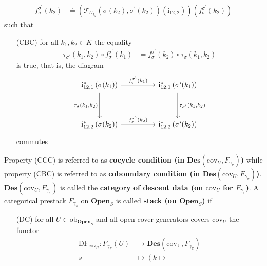 \begin{exa}
\begin{enumerate}
\begin{align*}
  f_{\sigma}^{\sigma^{\backprime}}(k_{2})
  &\doteq
  \left(
    \mathcal{T}_{U_{k_{2}}}
    \left(
      \sigma(k_{2}),
      \sigma^{\backprime}(k_{2})
    \right)
    \left(
      \mathrm{i}_{12,2}
    \right)
  \right)
  \left(
    f_{\sigma}^{\sigma^{\backprime}}(k_{2})
  \right)
\end{align*}
such that
\begin{enumerate}
\item[(CBC)]
for all $k_{1},k_{2} \in K$ the equality
\begin{align*}
  \tau_{\sigma^{\backprime}}(k_{1},k_{2})
  \circ
  f_{\sigma}^{\sigma^{\backprime}}(k_{1})
  &=
  f_{\sigma}^{\sigma^{\backprime}}(k_{2})
  \circ
  \tau_{\sigma}(k_{1},k_{2})
\end{align*}
is true, that is, the diagram
\[
\begin{tikzcd}[sep=huge]
  \mathrm{i}_{12,1}^{\ast}
  \left(
    \sigma(k_{1})
  \right)
  \arrow{r}{f_{\sigma}^{\sigma^{\backprime}}(k_{1})}
  \arrow[swap]{d}{\tau_{\sigma}(k_{1},k_{2})}
  &
  \mathrm{i}_{12,1}^{\ast}
  \left(
    \sigma^{\backprime}(k_{1})
  \right)
  \arrow{d}{\tau_{\sigma^{\backprime}}(k_{1},k_{2})}
  \\
  \mathrm{i}_{12,2}^{\ast}
  \left(
    \sigma(k_{2})
  \right)
  \arrow{r}{f_{\sigma}^{\sigma^{\backprime}}(k_{2})}
  &
  \mathrm{i}_{12,2}^{\ast}
  \left(
    \sigma^{\backprime}(k_{2})
  \right)
\end{tikzcd}
\]
commutes
\end{enumerate}
\end{enumerate}
Property (CCC) is referred to as \textbf{cocycle condition (in $\mathbf{Des}(\mathrm{cov}_{U},F_{\gamma_{\pi}})$)} while property (CBC) is referred to as \textbf{coboundary condition (in $\mathbf{Des}(\mathrm{cov}_{U},F_{\gamma_{\pi}})$)}. $\mathbf{Des}(\mathrm{cov}_{U},F_{\gamma_{\pi}})$ is called the \textbf{category of descent data (on $\mathrm{cov}_{U}$ for $F_{\gamma_{\pi}}$)}. A categorical prestack $F_{\gamma_{\pi}}$ on $\mathbf{Open}_{S}$ is called \textbf{stack (on $\mathbf{Open}_{S}$)} if
\begin{enumerate}
\item[(DC)]
for all $U \in \mathrm{ob}_{\mathbf{Open}_{S}}$ and all open cover generators covers $\mathrm{cov}_{U}$ the functor
\begin{align*}
  \mathrm{DF}_{\mathrm{cov}_{U}}
  \colon
  F_{\gamma_{\pi}}(U)
  &\rightarrow
  \mathbf{Des}(\mathrm{cov_{U}},F_{\gamma_{\pi}})
  \\
  s
  &\mapsto
  \left(
    k
    \mapsto

\end{align*}
\end{enumerate}
\end{exa}
